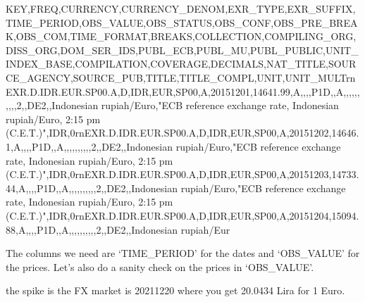 \documentclass[letterpaper,10pt,english]{sphinxmanual}
\begin{document}
\begin{sphinxVerbatim}[commandchars=\\\{\}]
 \PYG{p}{[}\PYG{p}{]}
\end{sphinxVerbatim}
\begin{sphinxalltt}
\textquotesingle{}KEY,FREQ,CURRENCY,CURRENCY\_DENOM,EXR\_TYPE,EXR\_SUFFIX,TIME\_PERIOD,OBS\_VALUE,OBS\_STATUS,OBS\_CONF,OBS\_PRE\_BREAK,OBS\_COM,TIME\_FORMAT,BREAKS,COLLECTION,COMPILING\_ORG,DISS\_ORG,DOM\_SER\_IDS,PUBL\_ECB,PUBL\_MU,PUBL\_PUBLIC,UNIT\_INDEX\_BASE,COMPILATION,COVERAGE,DECIMALS,NAT\_TITLE,SOURCE\_AGENCY,SOURCE\_PUB,TITLE,TITLE\_COMPL,UNIT,UNIT\_MULTrnEXR.D.IDR.EUR.SP00.A,D,IDR,EUR,SP00,A,2015\sphinxhyphen{}12\sphinxhyphen{}01,14641.99,A,,,,P1D,,A,,,,,,,,,,2,,DE2,,Indonesian rupiah/Euro,"ECB reference exchange rate, Indonesian rupiah/Euro, 2:15 pm (C.E.T.)",IDR,0rnEXR.D.IDR.EUR.SP00.A,D,IDR,EUR,SP00,A,2015\sphinxhyphen{}12\sphinxhyphen{}02,14646.1,A,,,,P1D,,A,,,,,,,,,,2,,DE2,,Indonesian rupiah/Euro,"ECB reference exchange rate, Indonesian rupiah/Euro, 2:15 pm (C.E.T.)",IDR,0rnEXR.D.IDR.EUR.SP00.A,D,IDR,EUR,SP00,A,2015\sphinxhyphen{}12\sphinxhyphen{}03,14733.44,A,,,,P1D,,A,,,,,,,,,,2,,DE2,,Indonesian rupiah/Euro,"ECB reference exchange rate, Indonesian rupiah/Euro, 2:15 pm (C.E.T.)",IDR,0rnEXR.D.IDR.EUR.SP00.A,D,IDR,EUR,SP00,A,2015\sphinxhyphen{}12\sphinxhyphen{}04,15094.88,A,,,,P1D,,A,,,,,,,,,,2,,DE2,,Indonesian rupiah/Eur\textquotesingle{}
\end{sphinxalltt}

\sphinxAtStartPar
The columns we need are ‘TIME\_PERIOD’ for the dates and ‘OBS\_VALUE’ for
the prices. Let’s also do a sanity check on the prices in ‘OBS\_VALUE’.

\begin{sphinxVerbatim}[commandchars=\\\{\}]
     
     
       
      
      
      
      
      
   
\end{sphinxVerbatim}

\sphinxAtStartPar
the spike is the FX \sphinxhyphen{} market is 2021\sphinxhyphen{}12\sphinxhyphen{}20 where you get 20.0434 Lira
for 1 Euro.
\end{document}
